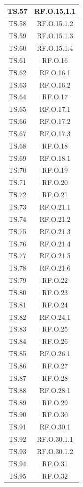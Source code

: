 \documentclass[10pt, a4paper]{article}
\begin{document}
\begin{xltabular}{\textwidth}{|c|c|}
\hline
TS.57 & RF.O.15.1.1 \\
\hline
TS.58 & RF.O.15.1.2 \\
\hline
TS.59 & RF.O.15.1.3 \\
\hline
TS.60 & RF.O.15.1.4 \\
\hline
TS.61 & RF.O.16 \\
\hline
TS.62 & RF.O.16.1 \\
\hline
TS.63 & RF.O.16.2 \\
\hline
TS.64 & RF.O.17 \\
\hline
TS.65 & RF.O.17.1 \\
\hline
TS.66 & RF.O.17.2 \\
\hline
TS.67 & RF.O.17.3 \\
\hline
TS.68 & RF.O.18 \\
\hline
TS.69 & RF.O.18.1 \\
\hline
TS.70 & RF.O.19 \\
\hline
TS.71 & RF.O.20 \\
\hline
TS.72 & RF.O.21 \\
\hline
TS.73 & RF.O.21.1 \\
\hline
TS.74 & RF.O.21.2 \\
\hline
TS.75 & RF.O.21.3 \\
\hline
TS.76 & RF.O.21.4 \\
\hline
TS.77 & RF.O.21.5 \\
\hline
TS.78 & RF.O.21.6 \\
\hline
TS.79 & RF.O.22 \\
\hline
TS.80 & RF.O.23 \\
\hline
TS.81 & RF.O.24 \\
\hline
TS.82 & RF.O.24.1 \\
\hline
TS.83 & RF.O.25 \\
\hline
TS.84 & RF.O.26 \\
\hline
TS.85 & RF.O.26.1 \\
\hline
TS.86 & RF.O.27 \\
\hline
TS.87 & RF.O.28 \\
\hline
TS.88 & RF.O.28.1 \\
\hline
TS.89 & RF.O.29 \\
\hline
TS.90 & RF.O.30 \\
\hline
TS.91 & RF.O.30.1 \\
\hline
TS.92 & RF.O.30.1.1 \\
\hline
TS.93 & RF.O.30.1.2 \\
\hline
TS.94 & RF.O.31 \\
\hline
TS.95 & RF.O.32 \\

\end{xltabular}
\end{document}
